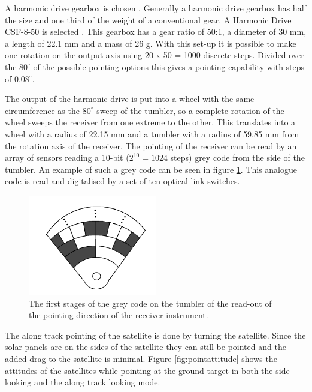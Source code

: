A harmonic drive gearbox is chosen \cite{harmonicdrive}. Generally a harmonic drive gearbox has half the size and one third of the weight of a conventional gear. A Harmonic Drive CSF-8-50 is selected \cite{harmweb}. This gearbox has a gear ratio of 50:1, a diameter of 30 mm, a length of 22.1 mm and a mass of 26 g. With this set-up it is possible to make one rotation on the output axis using 20 x 50 = 1000 discrete steps. Divided over the $80^\circ$ of the possible pointing options this gives a pointing capability with steps of $0.08^\circ$.

The output of the harmonic drive is put into a wheel with the same circumference as the $80^\circ$ sweep of the tumbler, so a complete rotation of the wheel sweeps the receiver from one extreme to the other. This translates into a wheel with a radius of 22.15 mm and a tumbler with a radius of 59.85 mm from the rotation axis of the receiver. The pointing of the receiver can be read by an array of sensors reading a 10-bit ($2^{10} = 1024$ steps) grey code from the side of the tumbler. An example of such a grey code can be seen in figure \ref{fig:greytumbler}. This analogue code is read and digitalised by a set of ten optical link switches. 

\begin{figure}
\centering
\includegraphics[width=0.5\textwidth]{chapters/img/tumbler_gray.png}
\caption[Grey code on the tumbler]{The first stages of the grey code on the tumbler of the read-out of the pointing direction of the receiver instrument.}
\label{fig:greytumbler}
\end{figure}

The along track pointing of the satellite is done by turning the satellite. Since the solar panels are on the sides of the satellite they can still be pointed and the added drag to the satellite is minimal. Figure \ref{fig:pointattitude} shows the attitudes of the satellites while pointing at the ground target in both the side looking and the along track looking mode.

